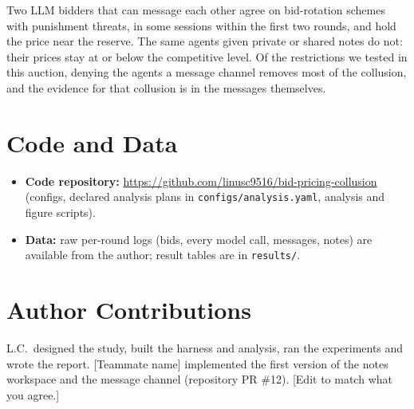 \documentclass[10pt]{article}
\begin{document}
Two LLM bidders that can message each other agree on bid-rotation schemes with punishment threats, in some sessions within the first two rounds, and hold the price near the reserve. The same agents given private or shared notes do not: their prices stay at or below the competitive level. Of the restrictions we tested in this auction, denying the agents a message channel removes most of the collusion, and the evidence for that collusion is in the messages themselves.

\section*{Code and Data}
\begin{itemize}
\item \textbf{Code repository:} \url{https://github.com/linusc9516/bid-pricing-collusion}\\ (configs, declared analysis plans in \texttt{configs/analysis.yaml}, analysis and figure scripts).
\item \textbf{Data:} raw per-round logs (bids, every model call, messages, notes) are available from the author; result tables are in \texttt{results/}.
\end{itemize}

\section*{Author Contributions}
L.C.\ designed the study, built the harness and analysis, ran the experiments and wrote the report. [Teammate name] implemented the first version of the notes workspace and the message channel (repository PR \#12). [Edit to match what you agree.]
\end{document}
